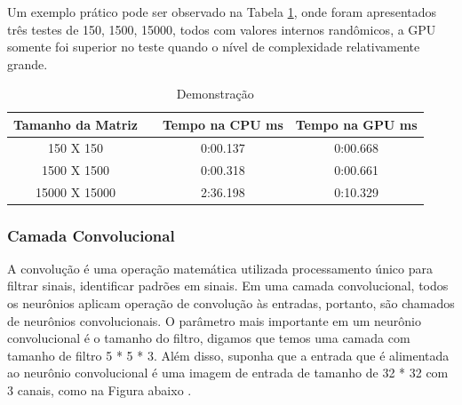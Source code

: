 \documentclass[conference]{IEEEtran}
\begin{document}
	Um exemplo pr\'atico pode ser observado na Tabela \ref{an:mult}, onde foram apresentados tr\^es testes de 150\texttwosuperior, 1500\texttwosuperior , 15000\texttwosuperior, todos com valores internos rand\^omicos, a GPU somente foi superior no teste quando o n\'ivel de complexidade relativamente grande.
	
	\begin{table}[H]
		\centering
		\caption{Demonstração}
		\label{an:mult}
		\begin{tabular}{clcc}
			\hline
			\multicolumn{1}{l}{\textbf{Tamanho da Matriz}} &  & \multicolumn{1}{l}{\textbf{Tempo na CPU ms}} & \multicolumn{1}{l}{\textbf{Tempo na GPU ms}} \\ \hline
			150 X 150                                      &  & 0:00.137                                     & 0:00.668                                     \\
			1500 X 1500                                    &  & 0:00.318                                     & 0:00.661                                     \\
			15000 X 15000                                  &  & 2:36.198                                     & 0:10.329                                     
		                                \\ \hline
		\end{tabular}
	\end{table}
	
	\subsubsection{Camada Convolucional}
	A convolução é uma operação matemática utilizada processamento único para filtrar sinais, identificar padrões em sinais. Em uma camada convolucional, todos os neurônios aplicam operação de convolução às entradas, portanto, são chamados de neurônios convolucionais. O parâmetro mais importante em um neurônio convolucional é o tamanho do filtro, digamos que temos uma camada com tamanho de filtro 5 * 5 * 3. Além disso, suponha que a entrada que é alimentada ao neurônio convolucional é uma imagem de entrada de tamanho de 32 * 32 com 3 canais, como na Figura abaixo \cite{IEEEhowto:4}. 
	
\end{document}
